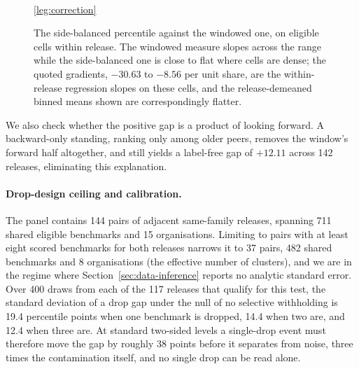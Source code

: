 \documentclass{article}
\begin{document}
\begin{figure}[H]\centering
\\[2pt]
{\footnotesize \ref{leg:correction}}
\caption{The side-balanced percentile against the windowed one, on eligible cells within release.
The windowed measure slopes across the range while the side-balanced one is close to flat where cells are dense; the quoted gradients, $-30.63$ to $-8.56$ per unit share, are the within-release regression slopes on these cells, and the release-demeaned binned means shown are correspondingly flatter.}
\label{fig:correction}
\end{figure}

We also check whether the positive gap is a product of looking forward. A backward-only standing, ranking only among older peers, removes the window's forward half altogether, and still yields a label-free gap of $+12.11$ across 142 releases, eliminating this explanation.

\paragraph{Drop-design ceiling and calibration.}
The panel contains 144 pairs of adjacent same-family releases, spanning 711 shared eligible benchmarks and 15 organisations. Limiting to pairs with at least eight scored benchmarks for both releases narrows it to 37 pairs, 482 shared benchmarks and 8 organisations (the effective number of clusters), and we are in the regime where Section~\ref{sec:data-inference} reports no analytic standard error. Over 400 draws from each of the 117 releases that qualify for this test, the standard deviation of a drop gap under the null of no selective withholding is 19.4 percentile points when one benchmark is dropped, 14.4 when two are, and 12.4 when three are. At standard two-sided levels a single-drop event must therefore move the gap by roughly 38 points before it separates from noise, three times the contamination itself, and no single drop can be read alone.
\end{document}

